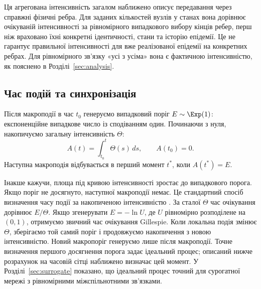 Ця агрегована інтенсивність загалом наближено описує передавання через справжні фізичні ребра. Для заданих кількостей вузлів у станах вона дорівнює очікуваній інтенсивності за рівномірного випадкового вибору кінців ребер, перш ніж враховано їхні конкретні ідентичності, стани та історію епідемії. Це не гарантує правильної інтенсивності для вже реалізованої епідемії на конкретних ребрах. Для рівномірного зв'язку «усі з усіма» вона є фактичною інтенсивністю, як пояснено в Розділі~\ref{sec:analysis}. 

\subsection{Час подій та синхронізація}
\label{sec:timing}

Після макроподії в час $t_0$ генеруємо випадковий поріг $E\sim\Exp(1)$: експоненційне випадкове число із сподіванням один. Починаючи з нуля, накопичуємо загальну інтенсивність $\Theta$:
\begin{equation}
\label{eq:hazard_integral}
A(t)=\int_{t_0}^{t}\Theta(s)\,ds,
\qquad A(t_0)=0.
\end{equation}
Наступна макроподія відбувається в перший момент
$t^\ast$, коли $A(t^\ast)=E$.


Інакше кажучи, площа під кривою інтенсивності зростає до випадкового порога. Якщо поріг не досягнуто, наступної макроподії немає. Це стандартний спосіб визначення часу події за накопиченою інтенсивністю \citep{ethier1986,anderson2007}. За сталої $\Theta$ час очікування дорівнює $E/\Theta$. Якщо згенерувати $E=-\ln U$, де $U$ рівномірно розподілене на $(0,1)$, отримуємо звичний час очікування Gillespie. Коли локальна подія змінює $\Theta$, зберігаємо той самий поріг і продовжуємо накопичення з новою інтенсивністю. Новий макропоріг генеруємо лише після макроподії. Точне визначення першого досягнення порога задає ідеальний процес; описаний нижче розрахунок на часовій сітці наближено визначає цей момент. У Розділі~\ref{sec:surrogate} показано, що ідеальний процес точний для сурогатної мережі з рівномірними міжспільнотними зв’язками.

